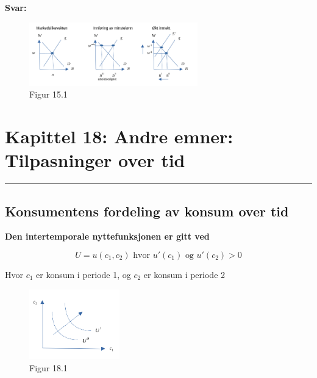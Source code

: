 \documentclass[
  letterpaper,
  DIV=11,
  numbers=noendperiod]{scrartcl}
\begin{document}
\textbf{Svar:}

\begin{figure}[H]

{\centering \includegraphics[width=0.65\textwidth,height=\textheight]{drawio/oppg_arbm.png}

}

\caption{Figur 15.1}

\end{figure}%

\section{Kapittel 18: Andre emner: Tilpasninger over
tid}\label{kapittel-18-andre-emner-tilpasninger-over-tid}

\begin{center}\rule{0.5\linewidth}{0.5pt}\end{center}

\subsection{Konsumentens fordeling av konsum over
tid}\label{konsumentens-fordeling-av-konsum-over-tid}

\textbf{Den intertemporale nyttefunksjonen er gitt ved}

\[
U = u(c_1,c_2) \text{ hvor } u'(c_1) \text{ og } u'(c_2) >0
\]

Hvor \(c_1\) er konsum i periode 1, og \(c_2\) er konsum i periode 2

\begin{figure}[H]

{\centering \includegraphics[width=0.35\textwidth,height=\textheight]{drawio/int_nytte.png}

}

\caption{Figur 18.1}

\end{figure}%
\end{document}
